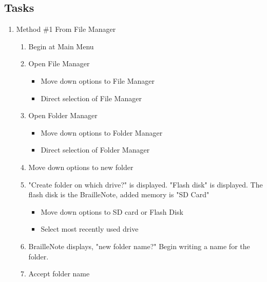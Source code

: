 \documentclass[10pt,letterpaper,twoside]{report}
\begin{document}
\subsection{Tasks}
\begin{enumerate}
	\item Method \#1 From File Manager
	      \begin{enumerate}
		      \item Begin at Main Menu 
		      \item Open File Manager
		            \begin{itemize}
			            \item Move down options to File Manager 
			            \item Direct selection of File Manager 
		            \end{itemize}
		      \item Open Folder Manager
		            \begin{itemize}
			            \item Move down options to Folder Manager 
			            \item Direct selection of Folder Manager 
		            \end{itemize}
		      \item Move down options to new folder 
		      \item "Create folder on which drive?" is displayed. "Flash disk" is displayed. The flash disk is the BrailleNote, added memory is "SD Card"
		            \begin{itemize}
			            \item Move down options to SD card or Flash Disk 
			            \item Select most recently used drive 
		            \end{itemize}
		      \item BrailleNote displays, "new folder name?" Begin writing a name for the folder.
		      \item Accept folder name 

\end{enumerate}
\end{enumerate}
\end{document}
